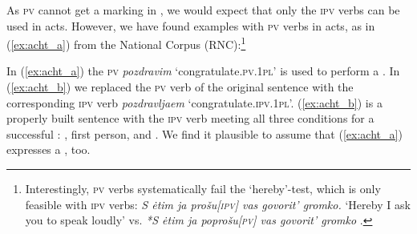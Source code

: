 \documentclass[output=paper,colorlinks,citecolor=brown,newtxmath,hidelinks]{langscibook}
\begin{document}
As \textsc{pv} cannot get a  marking in , we would expect that only the \textsc{ipv}  verbs can be used in  acts. However, we have found examples with \textsc{pv}  verbs in  acts, as in (\ref{ex:acht_a}) from the  National Corpus (RNC):\footnote{Interestingly, \textsc{pv}  verbs systematically fail the ‘hereby’-test, which is only feasible with \textsc{ipv} verbs: \textit{S ėtim ja prošu[\textsc{ipv}] vas govorit’ gromko.} ‘Hereby I ask you to speak loudly’ vs. \textit{*S ėtim ja poprošu[\textsc{pv}] vas govorit’ gromko} \citep{Eckardt2012}.}

\ea\label{ex:acht}
            \z
\z

\noindent In (\ref{ex:acht_a}) the \textsc{pv}  \textit{pozdravim} ‘congratulate\textsc{.pv.1pl}’ is used to perform a . In (\ref{ex:acht_b}) we replaced the \textsc{pv} verb of the original sentence with the corresponding \textsc{ipv} verb \textit{pozdravljaem} ‘congratulate\textsc{.ipv.1pl}’. (\ref{ex:acht_b}) is a properly built  sentence with the \textsc{ipv} verb meeting all three conditions for a successful : , first person, and . We find it plausible to assume that (\ref{ex:acht_a}) expresses a , too.
\end{document}
